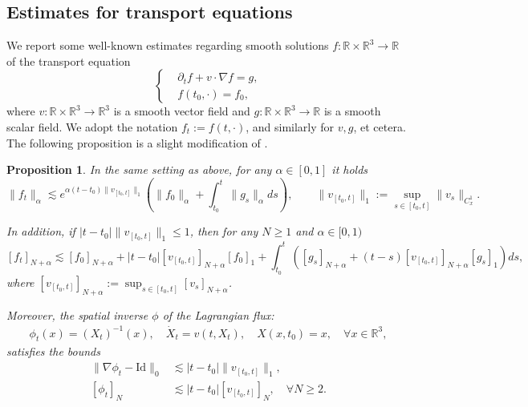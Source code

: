 \documentclass[10pt,a4paper]{amsart}
\numberwithin{equation}{section}
\numberwithin{corollario}{section}
\numberwithin{lemma}{section}
\newtheorem{prop}{Proposition}
\numberwithin{prop}{section}
\theoremstyle{definition}
\theoremstyle{remark}
\newcommand{\R}{\mathbb{R}}
\newcommand{\Id}{\mathrm{Id}}
\begin{document}
\subsection{Estimates for transport equations}
We report some well-known estimates regarding smooth solutions $f:\R \times \R^3 \to \R$ of the transport equation
\begin{equation}\label{e:transport}
    \begin{cases}
        &\partial_t f+v\cdot \nabla f=g,\\
        &f(t_0,\cdot)=f_0,
    \end{cases}
\end{equation}
where $v:\R \times\R^3 \to \R^3$ is a smooth vector field and $g :\R \times\R^3 \to \R$ is a smooth scalar field. 
We adopt the notation $f_t := f(t,\cdot)$, and similarly for $v,g$, et cetera.
The following proposition is a slight modification of \cite[Proposition B.1]{BuDLSzVi19}.
\begin{prop}\label{prop:transport}
In the same setting as above, for any $\alpha \in[0,1]$ it holds
    \begin{equation}\label{e:1stTransport}
        \|f_t\|_\alpha\lesssim e^{\alpha(t-t_0)\|v_{[t_0,t]}\|_{1}}\left(\|f_0\|_\alpha+\int_{t_0}^t\|g_s\|_\alpha ds\right),
        \qquad
        \|v_{[t_0,t]}\|_1:=\sup_{s\in [t_0,t]}\|v_s\|_{C^1_x}.
    \end{equation}
   
In addition, if $|t-t_0|\|v_{[t_0,t]}\|_1\le 1$, then for any $N\geq 1$ and $\alpha\in[0,1)$ 
\begin{equation}\label{e:2ndTransport}
    [f_t]_{N+\alpha}\lesssim [f_0]_{N+\alpha}+|t-t_0|[v_{[t_0,t]}]_{N+\alpha}[f_0]_1+\int_{t_0}^t\left([g_s]_{N+\alpha}+(t-s)[v_{[t_0,t]}]_{N+\alpha}[g_s]_1\right)ds,
\end{equation}
where $[v_{[t_0,t]}]_{N+\alpha}:=\sup_{s\in[t_0,t]}[v_s]_{N+\alpha}$.

Moreover, the spatial inverse $\phi$ of the Lagrangian flux:
\begin{align}
    \phi_t(x) = (X_t)^{-1}(x),
    \quad
    \dot{X}_t=v(t,X_t),
    \quad
    X(x,t_0)=x,
    \quad
    \forall x \in \R^3,
\end{align}
satisfies the bounds
\begin{align} \label{e:ClosetoIdFlux}
\|\nabla \phi_t-\Id\|_0 &\lesssim |t-t_0|\|v_{[t_0,t]}\|_1,
    \\
    [\phi_t]_N &\lesssim|t-t_0|[v_{[t_0,t]}]_N, \quad \forall N\geq 2.
\end{align}
\end{prop}
\end{document}
